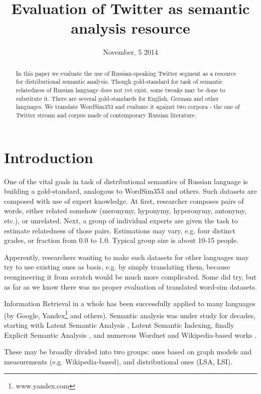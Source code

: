 \documentclass[11pt,letterpaper]{article}
\title{Evaluation of Twitter as semantic analysis resource}
\author{}
\date{November, 5 2014}
\begin{document}
\maketitle
\begin{abstract}
  In this paper we evaluate the use of Russian-speaking Twitter segment as a resource 
  for distributional semantic analysis. Though gold-standard for task of semantic relatedness
  of Russian language does not yet exist, some tweaks may be done to substitute it.  
  There are several gold-standards for English, German and other languages. 
  We translate WordSim353 and evaluate it against two corpora - the one of Twitter stream and 
  corpus made of contemporary Russian literature.
\end{abstract}

\section{Introduction}

One of the vital goals in task of distributional semantics of Russian language is building
a gold-standard, analogous to WordSim353 \cite{finkelstein2001placing} and others. 
Such datasets are composed with use of expert knowledge. At first, researcher composes pairs
of words, either related somehow (meronymy, hyponymy, hyperonymy, antonymy, etc.), or unrelated.
Next, a group of individual experts are given the task to estimate relatedness of those pairs.
Estimations may vary, e.g. four distinct grades, or fraction from 0.0 to 1.0. Typical group size is 
about 10-15 people.

Apperently, researchers wanting to make such datasets for other languages may try to use existing
ones as basis, e.g. by simply translating them, because reengineering it from scratch would be much more
complicated. Some did try, but as far as we know there was no proper evaluation of translated word-sim
datasets.

Information Retrieval in a whole has been successfully applied
to many languages (by Google, Yandex\footnote{www.yandex.com} and others). Semantic analysis
was under study for decades, starting with Latent Semantic Analysis \cite{landauer1998introduction}, 
Latent Semantic Indexing, finally Explicit Semantic Analysis \cite{gabrilovich2007computing}, and numerous
Wordnet and Wikipedia-based works \cite{zesch2008extracting}.

These may be broadly divided into two groups: ones based on graph models and 
measurements (e.g. Wikipedia-based), and distributional ones (LSA, LSI).
\end{document}
